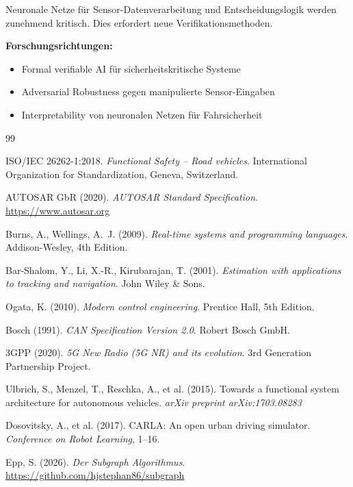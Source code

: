﻿\documentclass[a4paper,12pt]{article}
\begin{document}
Neuronale Netze für Sensor-Datenverarbeitung und Entscheidungslogik werden zunehmend 
kritisch. Dies erfordert neue Verifikationsmethoden.

\textbf{Forschungsrichtungen:}
\begin{itemize}
	\item Formal verifiable AI für sicherheitskritische Systeme
	\item Adversarial Robustness gegen manipulierte Sensor-Eingaben
	\item Interpretability von neuronalen Netzen für Fahrsicherheit
\end{itemize}


\begin{thebibliography}{99}

ISO/IEC 26262-1:2018. \emph{Functional Safety -- Road vehicles}.
International Organization for Standardization, Geneva, Switzerland.

AUTOSAR GbR (2020). \emph{AUTOSAR Standard Specification}. 
\url{https://www.autosar.org}

Burns, A., Wellings, A.~J. (2009). \emph{Real-time systems and programming languages}. 
Addison-Wesley, 4th Edition.

Bar-Shalom, Y., Li, X.-R., Kirubarajan, T. (2001). \emph{Estimation with applications 
to tracking and navigation}. John Wiley \& Sons.

Ogata, K. (2010). \emph{Modern control engineering}. Prentice Hall, 5th Edition.

Bosch (1991). \emph{CAN Specification Version 2.0}. Robert Bosch GmbH.

3GPP (2020). \emph{5G New Radio (5G NR) and its evolution}. 
3rd Generation Partnership Project.

Ulbrich, S., Menzel, T., Reschka, A., et al. (2015). 
Towards a functional system architecture for autonomous vehicles. 
\emph{arXiv preprint arXiv:1703.08283}

Dosovitsky, A., et al. (2017). 
CARLA: An open urban driving simulator. 
\emph{Conference on Robot Learning}, 1--16.

Epp, S. (2026). \emph{Der Subgraph Algorithmus}. 
\url{https://github.com/hjstephan86/subgraph}

\end{thebibliography}
\end{document}

